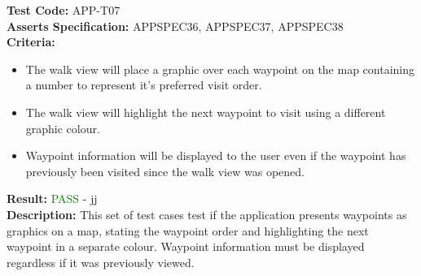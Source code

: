 \documentclass[11pt,a4paper]{report}
\begin{document}
\label{test:APP-T07}
\noindent\textbf{Test Code:} APP-T07\\
\textbf{Asserts Specification:} APPSPEC36, APPSPEC37, APPSPEC38\\ 
\textbf{Criteria:} \begin{itemize}
                     \item  The walk view will place a graphic over each waypoint on the map containing a number to represent it's preferred visit order.
                     \item The walk view will highlight the next waypoint to visit using a different graphic colour.
                     \item Waypoint information will be displayed to the user even if the waypoint has previously been visited since the walk view was opened. 
                   \end{itemize}
\textbf{Result:} \textcolor{green}{PASS} - jj\\
\textbf{Description:} This set of test cases test if the application presents waypoints as graphics on a map, stating the waypoint order and highlighting the next waypoint in a separate colour. Waypoint information must be displayed regardless if it was previously viewed.\\
\end{document}

